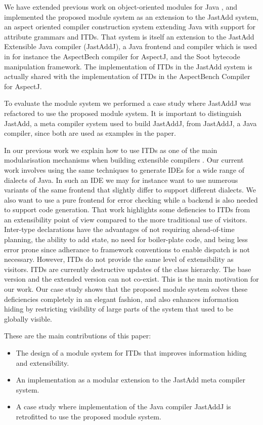 
We have extended previous work on object-oriented modules for Java \cite{modulesastypes}, 
and implemented the proposed module system as an extension to the 
Jast\-Add system, an aspect oriented compiler construction system 
extending Java with support for attribute grammars and ITDs. That system is itself an extension 
to the Jast\-Add Extensible Java compiler (Jast\-AddJ), a Java frontend and compiler
which is used in for instance the AspectBech compiler for AspectJ, and the 
Soot bytecode manipulation framework. The implementation of ITDs in the JastAdd
system is actually shared with the implementation of ITDs in the
AspectBench Compiler for AspectJ. 

To evaluate the module system we performed a case study where JastAddJ was 
refactored to use the proposed module system. It is important to 
distinguish JastAdd, a meta compiler system used to build JastAddJ, from JastAddJ, a Java 
compiler, since both are used as examples in the paper.

In our previous work we explain how to use ITDs as one of the main
modularisation mechanisms when building extensible compilers \cite{aosd08abc}. Our current
work involves using the same techniques to generate IDEs for a wide range
of dialects of Java. In such an IDE we may for instance want to use numerous variants of the
same frontend that slightly differ to support different dialects. We also
want to use a pure frontend for error checking while a backend is also
needed to support code generation.
That work highlights some defiencies to ITDs from an extensibility point of
view compared to the more traditional use of visitors.
Inter-type declarations have the advantages of not requiring ahead-of-time 
planning, the ability to add state, no need for boiler-plate code, and 
being less error prone since adherance to framework 
conventions to enable dispatch is not necessary.
However, ITDs do not provide the same level of extensibility as visitors.
ITDs are currently destructive updates of the class hierarchy. The base version and the
extended version can not co-exist. This is the main motivation for our
work. 
Our case study shows that the proposed module system solves these deficiencies completely in an
elegant fashion, and also enhances information hiding by restricting 
visibility of large parts of the system that used to be globally visible.

These are the main contributions of this paper:
\begin{itemize}
\item The design of a module system for ITDs that improves information
hiding and extensibility.
\item An implementation as a modular extension to the Jast\-Add meta 
compiler system.
\item A case study where implementation of the Java compiler JastAddJ is retrofitted to use the
proposed module system.
\end{itemize}

